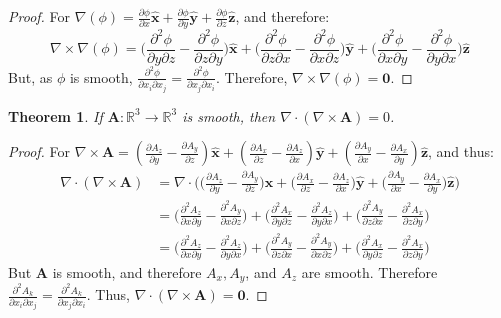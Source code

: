 \documentclass[oneside]{book}
\theoremstyle{mystyle}
\newtheorem{theorem}{Theorem}[section]
\begin{document}
\begin{proof}
For $\nabla(\phi) = \frac{\partial \phi}{\partial x}\hat{\mathbf{x}}+\frac{\partial \phi}{\partial y}\hat{\mathbf{y}}+\frac{\partial \phi}{\partial z}\hat{\mathbf{z}}$, and therefore:
\begin{equation*}
    \nabla \times \nabla(\phi) = \bigg(\frac{\partial^{2} \phi}{\partial y \partial z} - \frac{\partial^{2}\phi}{\partial z \partial y}\bigg)\hat{\mathbf{x}}+\bigg(\frac{\partial^{2} \phi}{\partial z \partial x} - \frac{\partial^{2}\phi}{\partial x \partial z}\bigg)\hat{\mathbf{y}}+\bigg(\frac{\partial^{2} \phi}{\partial x \partial y} - \frac{\partial^{2}\phi}{\partial y \partial x}\bigg)\hat{\mathbf{z}}
\end{equation*}
But, as $\phi$ is smooth, $\frac{\partial^{2}\phi}{\partial x_{i}\partial x_{j}} = \frac{\partial^{2}\phi}{\partial x_{j}\partial x_{i}}$. Therefore, $\nabla \times \nabla(\phi) = \boldsymbol{0}$.
\end{proof}
\begin{theorem}
If $\mathbf{A}:\mathbb{R}^{3}\rightarrow \mathbb{R}^{3}$ is smooth, then $\nabla\cdot(\nabla \times \mathbf{A}) = 0$.
\end{theorem}
\begin{proof}
For $\nabla \times \mathbf{A} = (\frac{\partial A_{z}}{\partial y} - \frac{\partial A_{y}}{\partial z})\hat{\mathbf{x}}+(\frac{\partial A_{x}}{\partial z} - \frac{\partial A_{z}}{\partial x})\hat{\mathbf{y}}+(\frac{\partial A_{y}}{\partial x} - \frac{\partial A_{x}}{\partial y})\hat{\mathbf{z}}$, and thus:
\begin{align*}
    \nabla \cdot (\nabla \times \mathbf{A}) &=\nabla \cdot \bigg(\big(\frac{\partial A_{z}}{\partial y} - \frac{\partial A_{y}}{\partial z}\big)\hat{\mathbf{x}}+\big(\frac{\partial A_{x}}{\partial z} - \frac{\partial A_{z}}{\partial x}\big)\hat{\mathbf{y}}+\big(\frac{\partial A_{y}}{\partial x} - \frac{\partial A_{x}}{\partial y}\big)\hat{\mathbf{z}}\bigg)\\
    &=\bigg(\frac{\partial^{2}A_{z}}{\partial x \partial y} - \frac{\partial^{2}A_{y}}{\partial x \partial z}\bigg)+\bigg(\frac{\partial^{2}A_{x}}{\partial y \partial z} - \frac{\partial^{2}A_{z}}{\partial y \partial x}\bigg) + \bigg(\frac{\partial^{2} A_{y}}{\partial z \partial x} - \frac{\partial^{2} A_{x}}{\partial z \partial y}\bigg)\\
    &= \bigg(\frac{\partial^{2} A_{z}}{\partial x \partial y} - \frac{\partial^{2} A_{z}}{\partial y \partial x}\bigg) + \bigg(\frac{\partial^{2} A_{y}}{\partial z \partial x} - \frac{\partial^{2} A_{y}}{\partial x \partial z}\bigg) + \bigg(\frac{\partial^{2}A_{x}}{\partial y \partial z} - \frac{\partial^{2} A_{x}}{\partial z \partial y}\bigg)
\end{align*}
But $\mathbf{A}$ is smooth, and therefore $A_{x},A_{y}$, and $A_{z}$ are smooth. Therefore $\frac{\partial^{2} A_{k}}{\partial x_{i} \partial x_{j}} = \frac{\partial^{2} A_{k}}{\partial x_{j} \partial x_{i}}$. Thus, $\nabla \cdot (\nabla \times \mathbf{A}) = \boldsymbol{0}$.
\end{proof}
\end{document}
